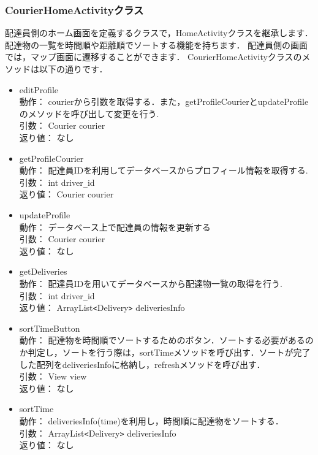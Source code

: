 \documentclass[a4j,titlepage]{jarticle}
\begin{document}
\subsubsection{CourierHomeActivityクラス}
配達員側のホーム画面を定義するクラスで，HomeActivityクラスを継承します．
配達物の一覧を時間順や距離順でソートする機能を持ちます．
配達員側の画面では，マップ画面に遷移することができます．
CourierHomeActivityクラスのメソッドは以下の通りです．
\begin{itemize}
  \item editProfile\\
  動作：  courierから引数を取得する．また，getProfileCourierとupdateProfileのメソッドを呼び出して変更を行う.\\
  引数：  Courier courier\\
  返り値：  なし

  \item getProfileCourier\\
  動作：  配達員IDを利用してデータベースからプロフィール情報を取得する.\\
  引数：  int driver\verb|_|id\\
  返り値：  Courier courier

  \item updateProfile\\
  動作：  データベース上で配達員の情報を更新する\\
  引数：  Courier courier\\
  返り値：  なし

  \item getDeliveries\\
  動作：  配達員IDを用いてデータベースから配達物一覧の取得を行う.\\
  引数：  int driver\verb|_|id\\
  返り値：  ArrayList\verb|<|Delivery\verb|>| deliveriesInfo

  \item sortTimeButton\\
  動作：  配達物を時間順でソートするためのボタン．ソートする必要があるのか判定し，ソートを行う際は，sortTimeメソッドを呼び出す．ソートが完了した配列をdeliveriesInfoに格納し，refreshメソッドを呼び出す．\\
  引数：  View view\\
  返り値：  なし

  \item sortTime\\
  動作：  deliveriesInfo(time)を利用し，時間順に配達物をソートする．\\
  引数：  ArrayList\verb|<|Delivery\verb|>| deliveriesInfo\\
  返り値：  なし


\end{itemize}
\end{document}

